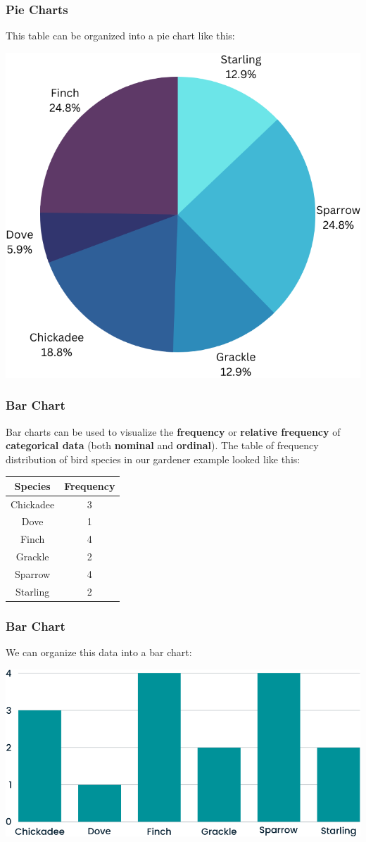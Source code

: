 \documentclass[aspectratio=169,11pt,svgnames,handout]{beamer}
\begin{document}
\begin{frame}
 \frametitle{Pie Charts}
 This table can be organized into a pie chart like this:
 \begin{center}
  \includegraphics[width=.4\textwidth]{gardener_pie.png}
 \end{center}
\end{frame}

\begin{frame}
 \frametitle{Bar Chart}
 Bar charts can be used to visualize the \textbf{frequency} or \textbf{relative
 frequency} of \textbf{categorical data} (both \textbf{nominal} and
 \textbf{ordinal}). \pause
 The table of frequency distribution of bird species in our gardener example
 looked like this:
 \begin{center}
  \begin{tabular}{c|c}
   \textbf{Species} & \textbf{Frequency}\\
   \toprule
   Chickadee & 3\\
   Dove & 1\\
   Finch & 4\\
   Grackle & 2\\
   Sparrow & 4\\
   Starling & 2
  \end{tabular}
 \end{center}
\end{frame}

\begin{frame}
 \frametitle{Bar Chart}
 We can organize this data into a bar chart:
 \begin{center}
  \includegraphics[width=.7\textwidth]{gardener_bar}
 \end{center}
\end{frame}
\end{document}
